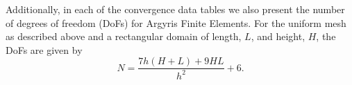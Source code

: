 Additionally, in each of the convergence data tables we also present the number
of degrees of freedom (DoFs) for Argyris Finite Elements. For the uniform mesh
as described above and a rectangular domain of length, $L$, and height, $H$, the
DoFs are given by
\begin{equation*}
  N = \frac{7h\left(H + L\right) + 9 H L}{h^2} + 6.
\end{equation*}

